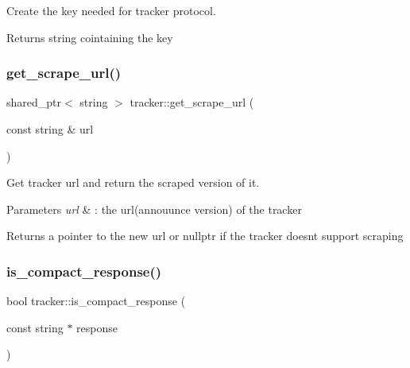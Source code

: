 Create the key needed for tracker protocol. 

\begin{DoxyReturn}{Returns}
string cointaining the key 
\end{DoxyReturn}
\mbox{\label{namespacetracker_ace1983d55d0f9efca5948d0a69d25ba6}} 
\subsubsection{\texorpdfstring{get\+\_\+scrape\+\_\+url()}{get\_scrape\_url()}}
{\footnotesize\ttfamily shared\+\_\+ptr$<$ string $>$ tracker\+::get\+\_\+scrape\+\_\+url (\begin{DoxyParamCaption}\item[{const string \&}]{url }\end{DoxyParamCaption})}



Get tracker url and return the scraped version of it. 


\begin{DoxyParams}{Parameters}
{\em url} & \+: the url(annouunce version) of the tracker \\
\hline
\end{DoxyParams}
\begin{DoxyReturn}{Returns}
a pointer to the new url or nullptr if the tracker doesn\textquotesingle{}t support scraping 
\end{DoxyReturn}
\mbox{\label{namespacetracker_ae542bb4bf17f34b8cadc3a4ae2f5ced2}} 
\subsubsection{\texorpdfstring{is\+\_\+compact\+\_\+response()}{is\_compact\_response()}}
{\footnotesize\ttfamily bool tracker\+::is\+\_\+compact\+\_\+response (\begin{DoxyParamCaption}\item[{const string $\ast$}]{response }\end{DoxyParamCaption})}



